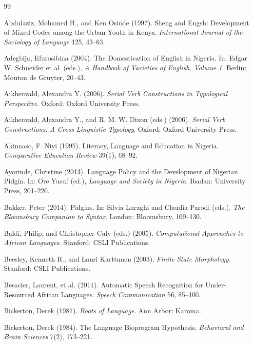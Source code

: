 \documentclass[12pt]{article}
\begin{document}
\newpage
\begin{thebibliography}{99}

Abdulaziz, Mohamed H., and Ken Osinde (1997).
Sheng and Engsh: Development of Mixed Codes among the Urban Youth in Kenya.
\textit{International Journal of the Sociology of Language} 125, 43--63.

Adegbija, Efurosibina (2004).
The Domestication of English in Nigeria.
In: Edgar W. Schneider et al. (eds.),
\textit{A Handbook of Varieties of English, Volume 1}.
Berlin: Mouton de Gruyter, 20--43.

Aikhenvald, Alexandra Y. (2006).
\textit{Serial Verb Constructions in Typological Perspective}.
Oxford: Oxford University Press.

Aikhenvald, Alexandra Y., and R. M. W. Dixon (eds.) (2006).
\textit{Serial Verb Constructions: A Cross-Linguistic Typology}.
Oxford: Oxford University Press.

Akinnaso, F. Niyi (1995).
Literacy, Language and Education in Nigeria.
\textit{Comparative Education Review} 39(1), 68--92.

Ayorinde, Christine (2013).
Language Policy and the Development of Nigerian Pidgin.
In: Ore Yusuf (ed.),
\textit{Language and Society in Nigeria}.
Ibadan: University Press, 201--220.

Bakker, Peter (2014).
Pidgins.
In: Silvia Luraghi and Claudia Parodi (eds.),
\textit{The Bloomsbury Companion to Syntax}.
London: Bloomsbury, 109--130.

Baldi, Philip, and Christopher Culy (eds.) (2005).
\textit{Computational Approaches to African Languages}.
Stanford: CSLI Publications.

Beesley, Kenneth R., and Lauri Karttunen (2003).
\textit{Finite State Morphology}.
Stanford: CSLI Publications.

Besacier, Laurent, et al. (2014).
Automatic Speech Recognition for Under-Resourced African Languages.
\textit{Speech Communication} 56, 85--100.

Bickerton, Derek (1981).
\textit{Roots of Language}.
Ann Arbor: Karoma.

Bickerton, Derek (1984).
The Language Bioprogram Hypothesis.
\textit{Behavioral and Brain Sciences} 7(2), 173--221.


\end{thebibliography}
\end{document}
